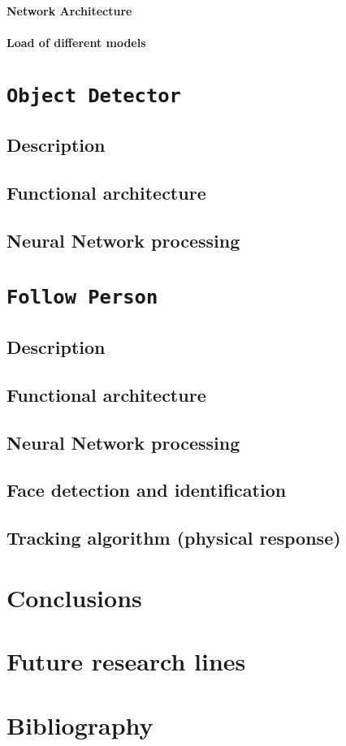 \subsubsection{Network Architecture}
\subsubsection{Load of different models}


\chapter{\texttt{Object Detector}}
\section{Description}
\section{Functional architecture}
\section{Neural Network processing}


\chapter{\texttt{Follow Person}}
\section{Description}
\section{Functional architecture}
\section{Neural Network processing}
\section{Face detection and identification}
\section{Tracking algorithm (physical response)}



\chapter{Conclusions}

\chapter{Future research lines}

\chapter{Bibliography}